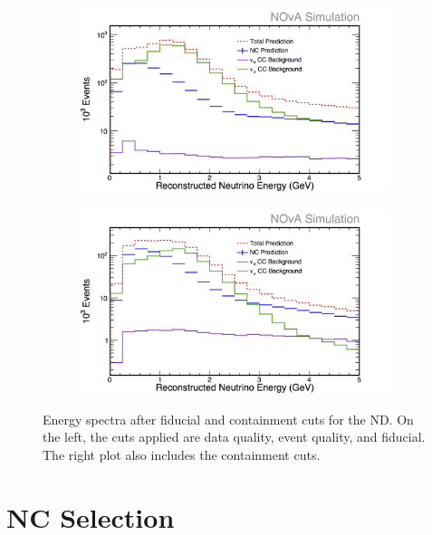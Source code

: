 \begin{figure}[h]
  \centering
  \begin{subfigure}{.48\textwidth}
    \centering
    \includegraphics[width=1\linewidth]{figures/RecoE2ND.png}
  \end{subfigure}
  \begin{subfigure}{.48\textwidth}
    \centering
    \includegraphics[width=1\linewidth]{figures/RecoE3ND.png}
  \end{subfigure}
  \caption[Energy Spectra After Fiducial and Containment Cuts, ND]{Energy spectra after fiducial and containment cuts for the ND. On the left, the cuts applied are data quality, event quality, and fiducial. The right plot also includes the containment cuts.}
  \label{fig:NP1FidContND}
\end{figure}

\section{NC Selection}

